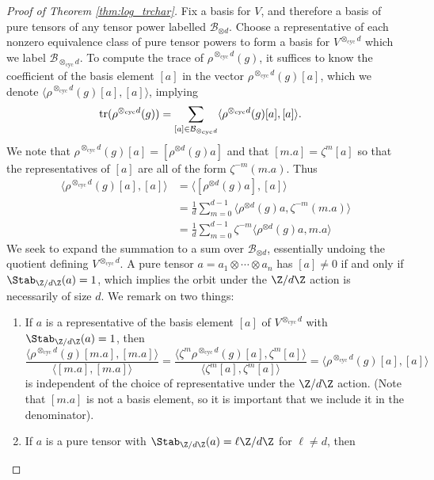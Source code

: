 \documentclass[12pt]{amsart}
\theoremstyle{plain}
\begin{document}
\begin{proof}[Proof of Theorem \ref{thm:log_trchar}]
Fix a basis for $V$, and therefore a basis of pure tensors of any tensor power labelled $\mathcal{B}_{\otimes d}$. Choose a representative of each nonzero equivalence class of pure tensor powers to form a basis for $V^{\otimes_{\text{cyc}} d}$ which we label $\mathcal{B}_{\otimes_{\text{cyc}} d}$. To compute the trace of $\rho^{\otimes_{\text{cyc}} d}(g)$, it suffices to know the coefficient of the basis element $[a]$ in the vector $\rho^{\otimes_{\text{cyc}} d}(g)[a]$, which we denote $\langle \rho^{\otimes_{\text{cyc}} d}(g)[a],[a]\rangle$, implying
\begin{align*}
{\rm tr}(\rho^{\otimes_{\text{cyc}}d}(g)) &= \sum_{\substack{[a]\in\mathcal{B}_{\otimes_{\text{cyc}} d}}} \langle\rho^{\otimes_{\text{cyc}} d}(g)[a],[a]\rangle.
\end{align*}
We note that $\rho^{\otimes_{\text{cyc}} d}(g)[a] = [\rho^{\otimes d}(g) a]$ and that $[m.a]=\zeta^m[a]$ so that the representatives of $[a]$ are all of the form $\zeta^{-m}(m.a)$. Thus
\begin{align*}
\langle \rho^{\otimes_{\text{cyc}} d}(g)[a],[a]\rangle &= \langle [\rho^{\otimes d}(g)a],[a]\rangle\\
&= \frac{1}{d}\sum_{m=0}^{d-1} \langle \rho^{\otimes d}(g)a,\zeta^{-m}(m.a)\rangle\\
&= \frac{1}{d}\sum_{m=0}^{d-1} \zeta^{-m}\langle \rho^{\otimes d}(g)a,m.a\rangle
\end{align*}
We seek to expand the summation to a sum over $\mathcal{B}_{\otimes d}$, essentially undoing the quotient defining $V^{\otimes_{\text{cyc}}d}$. A pure tensor $a=a_1\otimes \cdots \otimes a_n$ has $[a]\ne 0$ if and only if $\Stab_{\Z/d\Z}(a)=1$, which implies the orbit under the $\Z/d\Z$ action is necessarily of size $d$. We remark on two things:
\begin{enumerate}
    \item{If $a$ is a representative of the basis element $[a]$ of $V^{\otimes_{\text{cyc}} d}$ with $\Stab_{\Z/d\Z}(a) = 1$, then
    \[
    \frac{\langle \rho^{\otimes_{\text{cyc}} d}(g)[m.a],[m.a]\rangle}{\langle [m.a],[m.a]\rangle} = \frac{\langle \zeta^m\rho^{\otimes_{\text{cyc}} d}(g)[a],\zeta^m[a]\rangle}{\langle \zeta^m[a],\zeta^m[a]\rangle} = \langle \rho^{\otimes_{\text{cyc}} d}(g)[a],[a]\rangle
    \]
    is independent of the choice of representative under the $\Z/d\Z$ action. (Note that $[m.a]$ is not a basis element, so it is important that we include it in the denominator).}
    \item{If $a$ is a pure tensor with $\Stab_{\Z/d\Z}(a) = \ell\Z/d\Z$ for $\ell\ne d$, then
}
\end{enumerate}
\end{proof}
\end{document}
